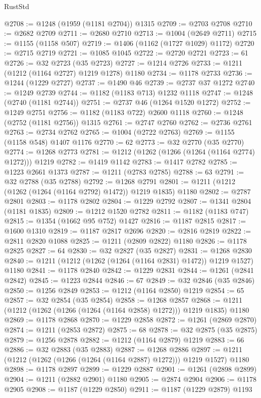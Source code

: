 \begin{lexlean}{RustStd}
\begin{coremodule}
@2708 := @1248 (@1959 (@1181 @2704)) @1315
@2709 := @2703 @2708
@2710 := @2682 @2709
@2711 := @2680 @2710
@2713 := @1004 (@2649 @2711)
@2715 := @1155 (@1158 @507)
@2719 := @1406 (@1162 (@1727 @1029) @1172)
@2720 := @2715 @2719
@2721 := @1085 @1045
@2722 := @2720 @2721
@2723 := 61
@2726 := @32 @2723 (@35 @2723)
@2727 := @1214 @2726
@2733 := @1211 (@1212 (@1164 @2727) @1219 @1278) @1180
@2734 := @1178 @2733
@2736 := @1244 (@1229 @2727)
@2737 := @1490 @46
@2739 := @2737 @37 @1272
@2740 := @1249 @2739
@2744 := @1182 (@1183 @713) @1232 @1118
@2747 := @1248 (@2740 (@1181 @2744))
@2751 := @2737 @46 (@1264 @1520 @1272)
@2752 := @1249 @2751
@2756 := @1182 (@1183 @722) @2600 @1118
@2760 := @1248 (@2752 (@1181 @2756)) @1315
@2761 := @2747 @2760
@2762 := @2736 @2761
@2763 := @2734 @2762
@2765 := @1004 (@2722 @2763)
@2769 := @1155 (@1158 @548) @1407 @1176
@2770 := 62
@2773 := @32 @2770 (@35 @2770)
@2774 := @1268 @2773
@2781 := @1212 (@1262 (@1266 (@1264 (@1164 @2774) @1272))) @1219
@2782 := @1419 @1142
@2783 := @1417 @2782
@2785 := @1223 @2661 @1373
@2787 := @1211 (@2783 @2785)
@2788 := 63
@2791 := @32 @2788 (@35 @2788)
@2792 := @1268 @2791
@2801 := @1211 (@1212 (@1262 (@1264 (@1164 @2792) @1472)) @1219 @1835) @1180
@2802 := @2787 @2801
@2803 := @1178 @2802
@2804 := @1229 @2792
@2807 := @1341 @2804 (@1181 @1835)
@2809 := @1212 @1520 @2782
@2811 := @1182 (@1183 @747)
@2815 := @1354 (@1662 @95 @752) @1427
@2816 := @1187 @2815
@2817 := @1600 @1310
@2819 := @1187 @2817 @2696
@2820 := @2816 @2819
@2822 := @2811 @2820 @1088
@2825 := @1211 (@2809 @2822) @1180
@2826 := @1178 @2825
@2827 := 64
@2830 := @32 @2827 (@35 @2827)
@2831 := @1268 @2830
@2840 := @1211 (@1212 (@1262 (@1264 (@1164 @2831) @1472)) @1219 @1527) @1180
@2841 := @1178 @2840
@2842 := @1229 @2831
@2844 := @1261 (@2841 @2842)
@2845 := @1223 @2844
@2846 := 67
@2849 := @32 @2846 (@35 @2846)
@2850 := @1256 @2849
@2853 := @1212 (@1164 @2850) @1219
@2854 := 65
@2857 := @32 @2854 (@35 @2854)
@2858 := @1268 @2857
@2868 := @1211 (@1212 (@1262 (@1266 (@1264 (@1164 @2858) @1272))) @1219 @1835) @1180
@2869 := @1178 @2868
@2870 := @1229 @2858
@2872 := @1261 (@2869 @2870)
@2874 := @1211 (@2853 @2872)
@2875 := 68
@2878 := @32 @2875 (@35 @2875)
@2879 := @1256 @2878
@2882 := @1212 (@1164 @2879) @1219
@2883 := 66
@2886 := @32 @2883 (@35 @2883)
@2887 := @1268 @2886
@2897 := @1211 (@1212 (@1262 (@1266 (@1264 (@1164 @2887) @1272))) @1219 @1527) @1180
@2898 := @1178 @2897
@2899 := @1229 @2887
@2901 := @1261 (@2898 @2899)
@2904 := @1211 (@2882 @2901) @1180
@2905 := @2874 @2904
@2906 := @1178 @2905
@2908 := @1187 (@1229 @2850)
@2911 := @1187 (@1229 @2879) @1193

\end{coremodule}
\end{lexlean}
